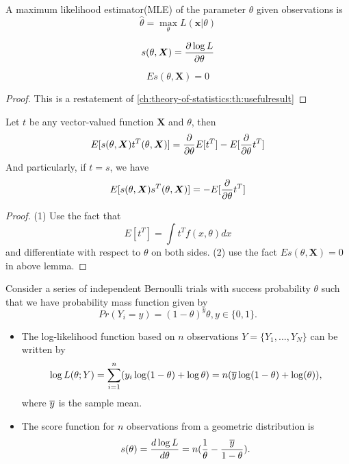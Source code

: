 \begin{refsection}
\begin{definition}
\end{definition}

\begin{definition}
	\cite[316]{casella2002statistical} A maximum likelihood estimator(MLE) of the parameter $\theta$ given observations is
	$$\hat{\theta} = \max_{\theta} L(\bm{x}|\theta)$$
\end{definition}


\begin{definition}\cite[548]{moon2000mathematical}
	
	$$s(\theta,\bm{X}) = \frac{\partial \log L}{\partial \theta}$$
\end{definition}

\begin{lemma}
	$$Es(\theta,\bm{X}) = 0$$
\end{lemma}
\begin{proof}
	This is a restatement of \autoref{ch:theory-of-statistics:th:usefulresult}
\end{proof}

\begin{lemma}\cite[550]{moon2000mathematical}
	Let $t$ be any vector-valued function $\bm{X}$ and $\theta$, then
	$$E[s(\theta,\bm{X})t^T(\theta,\bm{X})] = \frac{\partial}{\partial \theta} E[t^T] - E[\frac{\partial}{\partial \theta} t^T]$$ 
	And particularly, if $t = s$, we have
		$$E[s(\theta,\bm{X})s^T(\theta,\bm{X})] =  - E[\frac{\partial}{\partial \theta} t^T]$$ 	
\end{lemma}
\begin{proof}
(1)	Use the fact that
	$$E[t^T] = \int t^T f(x,\theta) dx$$
	and differentiate with respect to $\theta$ on both sides.
	(2) use the fact $Es(\theta,\bm{X}) = 0$ in above lemma.
\end{proof}


\begin{example}
Consider a series of independent Bernoulli trials with success probability $\theta$ such that we have probability mass function given by	
$$Pr(Y_i = y) = (1-\theta)^y \theta, y\in \{0,1 \}.$$

\begin{itemize}
	\item 
	The log-likelihood function based on $n$ observations $Y=\{Y_1,...,Y_N\}$ can be written by
	$$\log L(\theta; Y) = \sum_{i=1}^n (y_i \log(1-\theta) + \log \theta) = n(\overline{y}\log(1-\theta) + \log(\theta)),$$
	where $\overline{y}$ is the sample mean.
	\item 
	The score function for $n$ observations from a geometric distribution is
	$$s(\theta) = \frac{d \log L}{d \theta} = n(\frac{1}{\theta} - \frac{\overline{y}}{1-\theta}).$$
\end{itemize}
\end{example}



\end{refsection}

